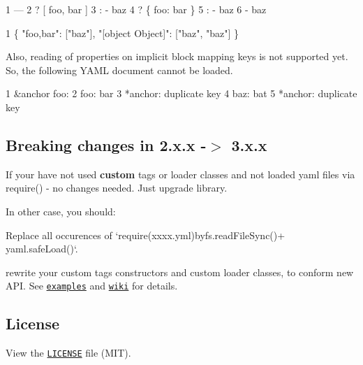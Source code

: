 \begin{DoxyCode}
1 ---
2 ? [ foo, bar ]
3 : - baz
4 ? \{ foo: bar \}
5 : - baz
6   - baz
\end{DoxyCode}



\begin{DoxyCode}
1 \{ "foo,bar": ["baz"], "[object Object]": ["baz", "baz"] \}
\end{DoxyCode}


Also, reading of properties on implicit block mapping keys is not supported yet. So, the following Y\+A\+M\+L document cannot be loaded.


\begin{DoxyCode}
1 &anchor foo:
2   foo: bar
3   *anchor: duplicate key
4   baz: bat
5   *anchor: duplicate key
\end{DoxyCode}


\subsection*{Breaking changes in 2.\+x.\+x -\/$>$ 3.\+x.\+x }

If your have not used {\bfseries custom} tags or loader classes and not loaded yaml files via {\ttfamily require()} -\/ no changes needed. Just upgrade library.

In other case, you should\+:


\begin{DoxyEnumerate}
\item Replace all occurences of `require(\textquotesingle{}xxxx.\+yml\textquotesingle{}){\ttfamily by}fs.\+read\+File\+Sync(){\ttfamily + }yaml.\+safe\+Load()`.
\item rewrite your custom tags constructors and custom loader classes, to conform new A\+P\+I. See \href{https://github.com/nodeca/js-yaml/tree/master/examples}{\tt examples} and \href{https://github.com/nodeca/js-yaml/wiki}{\tt wiki} for details.
\end{DoxyEnumerate}

\subsection*{License }

View the \href{https://github.com/nodeca/js-yaml/blob/master/LICENSE}{\tt L\+I\+C\+E\+N\+S\+E} file (M\+I\+T). 